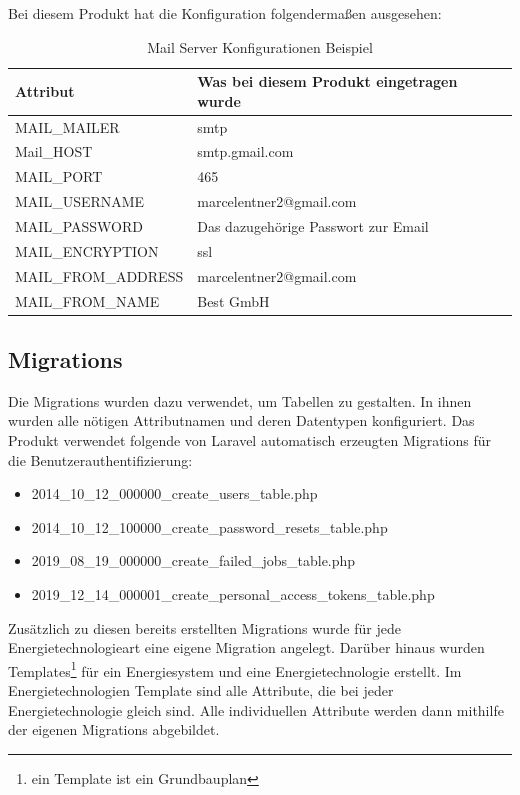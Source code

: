Bei diesem Produkt hat die Konfiguration folgendermaßen ausgesehen:
\begin{table}[h]
	
	\begin{tabular}{|l|l|}
		\hline
		Attribut         & Was bei diesem Produkt eingetragen wurde                      \\ \hline
		MAIL\_MAILER     & smtp                     \\ \hline
		Mail\_HOST          & smtp.gmail.com         \\ \hline
		MAIL\_PORT       & 465 \\ \hline
		MAIL\_USERNAME      & marcelentner2@gmail.com  \\ \hline
		MAIL\_PASSWORD   & Das dazugehörige Passwort zur Email                \\ \hline
		MAIL\_ENCRYPTION    & ssl                             \\ \hline
		MAIL\_FROM\_ADDRESS & marcelentner2@gmail.com                       \\ \hline
		MAIL\_FROM\_NAME & Best GmbH  \\ \hline
	\end{tabular}
	\caption{Mail Server Konfigurationen Beispiel}
	\label{sec: Mail Server Konfigurationen Beispiel}
\end{table}
\newpage

\subsection{Migrations}
Die Migrations wurden dazu verwendet, um Tabellen zu gestalten. In ihnen wurden alle nötigen Attributnamen und deren Datentypen konfiguriert. Das Produkt verwendet folgende von Laravel automatisch erzeugten Migrations für die Benutzerauthentifizierung: 
\begin{itemize}
\item 2014\_10\_12\_000000\_create\_users\_table.php
\item 2014\_10\_12\_100000\_create\_password\_resets\_table.php
\item 2019\_08\_19\_000000\_create\_failed\_jobs\_table.php
\item 2019\_12\_14\_000001\_create\_personal\_access\_tokens\_table.php
\end{itemize}
Zusätzlich zu diesen bereits erstellten Migrations wurde für jede Energietechnologieart eine eigene Migration angelegt. Darüber hinaus wurden Templates\footnote{ein Template ist ein Grundbauplan} für ein Energiesystem und eine Energietechnologie erstellt. Im Energietechnologien Template sind alle Attribute, die bei jeder Energietechnologie gleich sind. Alle individuellen Attribute werden dann mithilfe der eigenen Migrations abgebildet.

